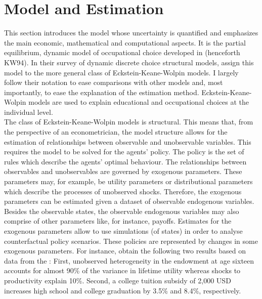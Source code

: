 \documentclass[a4paper,12pt]{article}
\begin{document}
\newpage %

\section{Model and Estimation}
\thispagestyle{plain} %
This section introduces the model whose uncertainty is quantified and emphasizes the main economic, mathematical and computational aspects. It is the partial equilibrium, dynamic model of occupational choice developed in \cite{Keane.1994} (henceforth KW94). In their survey of dynamic discrete choice structural models, \cite{Aguirregabiria.2010} assign this model to the more general class of Eckstein-Keane-Wolpin models. I largely follow their notation to ease comparisons with other models and, most importantly, to ease the explanation of the estimation method. Eckstein-Keane-Wolpin models are used to explain educational and occupational choices at the individual level. \\
\newline
The class of Eckstein-Keane-Wolpin models is structural. This means that, from the perspective of an econometrician, the model structure allows for the estimation of relationships between observable and unobservable variables. This requires the model to be solved for the agents' policy. The policy is the set of rules which describe the agents' optimal behaviour. The relationships between observables and unobservables are governed by exogenous parameters. These parameters may, for example, be utility parameters or distributional parameters which describe the processes of unobserved shocks. Therefore, the exogenous parameters can be estimated given a dataset of observable endogenous variables. Besides the observable states, the observable endogenous variables may also comprise of other parameters like, for instance, payoffs. Estimates for the exogenous parameters allow to use simulations (of states) in order to analyse counterfactual policy scenarios. These policies are represented by changes in some exogenous parameters. For instance, \cite{Keane.1997} obtain the following two results based on data from the : First, unobserved heterogeneity in the endowment at age sixteen accounts for almost 90\% of the variance in lifetime utility whereas shocks to productivity explain 10\%. Second, a college tuition subsidy of 2,000 USD increases high school and college graduation by 3.5\% and 8.4\%, respectively.\\
\newline
\end{document}
